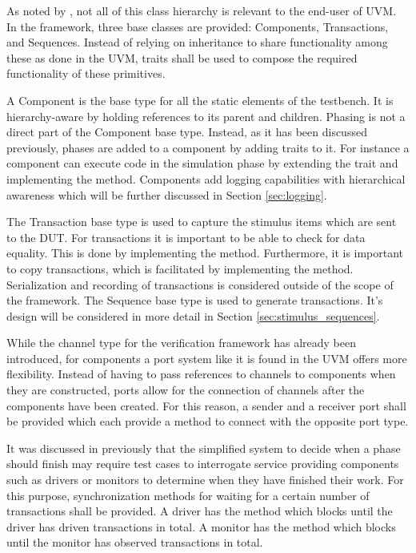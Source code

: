 As noted by \citeauthor{sutherland2015uvm} \cite{sutherland2015uvm}, not all of this class hierarchy is relevant to
the end-user of UVM. In the framework, three base classes are provided: Components, Transactions, and Sequences.
Instead of relying on inheritance to share functionality among these as done in the UVM, traits shall be used
to compose the required functionality of these primitives.

A Component is the base type for all the static elements of the testbench. It is hierarchy-aware by holding
references to its parent and children. Phasing is not a direct part of the Component base type. Instead, as it has
been discussed previously, phases are added to a component by adding traits to it. For instance a component can
execute code in the simulation phase by extending the  trait and implementing the 
method. Components add logging capabilities with hierarchical awareness which will be further discussed in Section
\ref{sec:logging}.

The Transaction base type is used to capture the stimulus items which are sent to the DUT. For transactions it is
important to be able to check for data equality. This is done by implementing the  method.
Furthermore, it is important to copy transactions, which is facilitated by implementing the  method.
Serialization and recording of transactions is considered outside of the scope of the framework. The Sequence base
type is used to generate transactions. It's design will be considered in more detail in Section \ref{sec:stimulus_sequences}.

While the channel type for the verification framework has already been introduced, for components a port system like it is found in the UVM offers more flexibility. Instead of having to pass references to channels to components when they are constructed, ports allow for the connection of channels after the components have been created. For this reason, a sender and a receiver port shall be provided which each provide a  method to connect with the opposite port type. 

It was discussed in previously that the simplified system to decide when a phase should finish may require test cases to interrogate service providing components such as drivers or monitors to determine when they have finished their work. For this purpose, synchronization methods for waiting for a certain number of transactions shall be provided. A driver has the  method which blocks until the driver has driven  transactions in total. A monitor has the  method which blocks until the monitor has observed  transactions in total.

